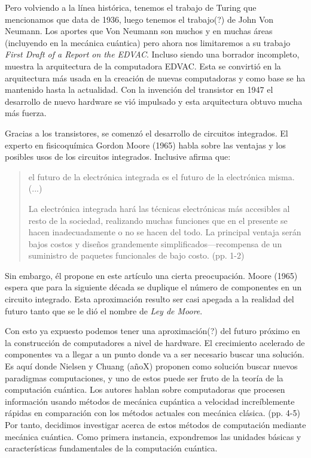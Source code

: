 \documentclass[11pt,a4paper]{article}
\begin{document}
Pero volviendo a la línea histórica, tenemos el trabajo de Turing que mencionamos que data de 1936, luego tenemos el trabajo(?) de John Von Neumann. Los aportes que Von Neumann son muchos y en muchas áreas (incluyendo en la mecánica cuántica) pero ahora nos limitaremos a su trabajo \textit{First Draft of a Report on the EDVAC}. Incluso siendo una borrador incompleto, muestra la arquitectura de la computadora EDVAC. Esta se convirtió en la arquitectura más usada en la creación de nuevas computadoras y como base se ha mantenido hasta la actualidad. Con la invención del transistor en 1947 el desarrollo de nuevo hardware se vió impulsado y esta arquitectura obtuvo mucha más fuerza.

Gracias a los transistores, se comenzó el desarrollo de circuitos integrados. El experto en fisicoquímica Gordon Moore (1965) habla sobre las ventajas y los posibles usos de los circuitos integrados. Inclusive afirma que: 
\begin{quote}
el futuro de la electrónica integrada es el futuro de la electrónica misma.(...)

La electrónica integrada hará las técnicas electrónicas más accesibles al resto de la sociedad, realizando muchas funciones que en el presente se hacen inadecuadamente o no se hacen del todo. La principal ventaja serán bajos costos y diseños grandemente simplificados---recompensa de un suministro de paquetes funcionales de bajo costo. (pp. 1-2)
\end{quote}
Sin embargo, él propone en este artículo una cierta preocupación. Moore (1965) espera que para la siguiente década se duplique el número de componentes en un circuito integrado. Esta aproximación resulto ser casi apegada a la realidad del futuro tanto que se le dió el nombre de \textit{Ley de Moore}.

Con esto ya expuesto podemos tener una aproximación(?) del futuro próximo en la construcción de computadores a nivel de hardware. El crecimiento acelerado de componentes va a llegar a un punto donde va a ser necesario buscar una solución. Es aquí donde Nielsen y Chuang (añoX) proponen como solución buscar nuevos paradigmas computaciones, y uno de estos puede ser fruto de la teoría de la computación cuántica. Los autores hablan sobre computadoras que procesen información usando métodos de mecánica cupántica a velocidad increíblemente rápidas en comparación con los métodos actuales con mecánica clásica. (pp. 4-5) Por tanto, decidimos investigar acerca de estos métodos de computación mediante mecánica cuántica. Como primera instancia, expondremos las unidades básicas y características fundamentales de la computación cuántica.
 
\end{document}
